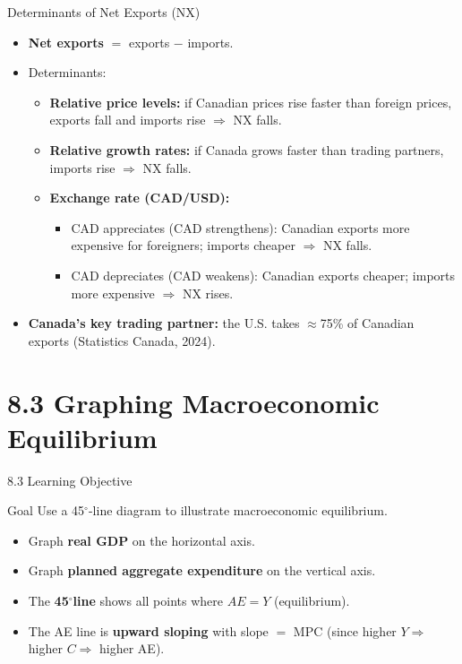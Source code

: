 \documentclass[aspectratio=169]{beamer}
\newcommand{\degree}{$^\circ$}
\begin{document}
\begin{frame}{Determinants of Net Exports (NX)}
\transfade
\begin{itemize}[<+->]
  \item \textbf{Net exports} $= $ exports $-$ imports.
  \item Determinants:
  \begin{itemize}[<+->]
    \item \textbf{Relative price levels:} if Canadian prices rise faster than foreign prices, exports fall and imports rise $\Rightarrow$ NX falls.
    \item \textbf{Relative growth rates:} if Canada grows faster than trading partners, imports rise $\Rightarrow$ NX falls.
    \item \textbf{Exchange rate (CAD/USD):}
    \begin{itemize}[<+->]
      \item \alert{CAD appreciates} (CAD strengthens): Canadian exports more expensive for foreigners; imports cheaper $\Rightarrow$ NX falls.
      \item \alert{CAD depreciates} (CAD weakens): Canadian exports cheaper; imports more expensive $\Rightarrow$ NX rises.
    \end{itemize}
  \end{itemize}
  \item \textbf{Canada's key trading partner:} the U.S. takes $\approx$75\% of Canadian exports (Statistics Canada, 2024).
\end{itemize}
\end{frame}

\section{8.3 Graphing Macroeconomic Equilibrium}

\begin{frame}{8.3 Learning Objective}
\transfade
\begin{block}{Goal}
Use a 45\degree-line diagram to illustrate macroeconomic equilibrium.
\end{block}
\begin{itemize}[<+->]
  \item Graph \textbf{real GDP} on the horizontal axis.
  \item Graph \textbf{planned aggregate expenditure} on the vertical axis.
  \item The \textbf{45\degree line} shows all points where $AE = Y$ (equilibrium).
  \item The AE line is \textbf{upward sloping} with slope $= $ MPC (since higher $Y \Rightarrow$ higher $C \Rightarrow$ higher AE).
\end{itemize}
\end{frame}
\end{document}
